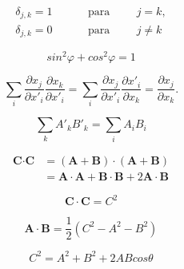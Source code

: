 \documentclass{article}
\begin{document}
	\begin{equation}
		\begin{split}
			\delta_{j,k} = 1 \hspace{1cm} &\text{para} \hspace{1cm}  j = k, \\
			\delta_{j,k} = 0 \hspace{1cm} &\text{para} \hspace{1cm}  j \neq k
		\end{split}
		\label{ec16}
	\end{equation}
	
	\begin{equation}
		sin^2 \varphi + cos^2 \varphi = 1
		\label{ec17_1}
	\end{equation}
	
	\begin{equation}
		\sum_{i} \frac{\partial x_j}{\partial x'_i} \frac{\partial x_k}{\partial x'_i} = 
		\sum_{i} \frac{\partial x_j}{\partial x'_i} \frac{\partial x'_i}{\partial x_k} = 
		\frac{\partial x_j}{\partial x_k}.
		\label{ec17}
	\end{equation}
	
	\begin{equation}
		\sum_{k} A'_k B'_k =
		\sum_{i} A_i  B_i
		\label{ec18}
	\end{equation}

	\begin{equation}
		\begin{split}
			\textbf{C} \cdot \textbf{C} 
			&= (\textbf{A} + \textbf{B}) \cdot (\textbf{A} + \textbf{B}) \\
			&= \textbf{A} \cdot \textbf{A} + \textbf{B} \cdot \textbf{B} + 2\textbf{A} \cdot \textbf{B}
		\end{split}
		\label{ec19}
	\end{equation}

	\begin{equation}
		\textbf{C} \cdot \textbf{C} = C^2
		\label{ec20}
	\end{equation}
	
	\begin{equation}
		\textbf{A} \cdot \textbf{B} = 
		\frac{1}{2} (C^2 - A^2 - B^2)
		\label{ec21}
	\end{equation}
	
	\begin{equation}
		C^2 = A^2 + B^2 + 2ABcos\theta
		\label{ec22}
	\end{equation}
	
\end{document}

